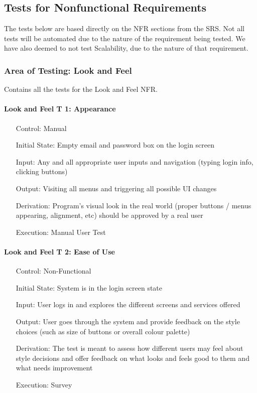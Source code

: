 \documentclass[12pt, titlepage]{article}
\begin{document}
\subsection{Tests for Nonfunctional Requirements}

The tests below are based directly on the NFR sections from the SRS. Not all tests will be automated due to the nature of the requirement being tested.
We have also deemed to not test Scalability, due to the nature of that requirement.

\subsubsection{Area of Testing: Look and Feel}

Contains all the tests for the Look and Feel NFR.

\paragraph*{Look and Feel T 1: Appearance}
\begin{itemize}
	\item[Control:] Manual
	\item[Initial State:] Empty email and password box on the login screen
	\item[Input:] Any and all appropriate user inputs and navigation (typing login info, clicking buttons)
	\item[Output:] Visiting all menus and triggering all possible UI changes
	\item[Derivation:] Program's visual look in the real world (proper buttons / menus appearing, alignment, etc) should be approved by a real user
	\item[Execution:] Manual User Test
\end{itemize}

\paragraph*{Look and Feel T 2: Ease of Use}
\begin{itemize}
	\item[Control:] Non-Functional
	\item[Initial State:] System is in the login screen state
	\item[Input:] User logs in and explores the different screens and services offered
	\item[Output:] User goes through the system and provide feedback on the style choices (such as size of buttons or overall colour palette)
	\item[Derivation:] The test is meant to assess how different users may feel about style decisions and offer feedback on what looks and feels good to them and what needs improvement
	\item[Execution:] Survey
\end{itemize}
\end{document}
